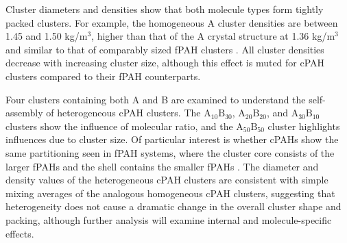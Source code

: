 Cluster diameters and densities show that both molecule types form tightly packed clusters. For example, the homogeneous A cluster densities are between 1.45 and 1.50 kg/$\text{m}^{3}$, higher than that of the A crystal structure at 1.36 kg/$\text{m}^{3}$ \cite{CORANN11unitcell} and similar to that of comparably sized fPAH clusters \cite{chen2014size}. All cluster densities decrease with increasing cluster size, although this effect is muted for cPAH clusters compared to their fPAH counterparts. 

Four clusters containing both A and B are examined to understand the self-assembly of heterogeneous cPAH clusters. The $\text{A}_{\text{10}}\text{B}_{\text{30}}$, $\text{A}_{\text{20}}\text{B}_{\text{20}}$, and  $\text{A}_{\text{30}}\text{B}_{\text{10}}$ clusters show the influence of molecular ratio, and the $\text{A}_{\text{50}}\text{B}_{\text{50}}$ cluster highlights influences due to cluster size. Of particular interest is whether cPAHs show the same partitioning seen in fPAH systems, where the cluster core consists of the larger fPAHs and the shell contains the smaller fPAHs \cite{bowal2018partitioning}. The diameter and density values of the heterogeneous cPAH clusters are consistent with simple mixing averages of the analogous homogeneous cPAH clusters, suggesting that heterogeneity does not cause a dramatic change in the overall cluster shape and packing, although further analysis will examine internal and molecule-specific effects.


